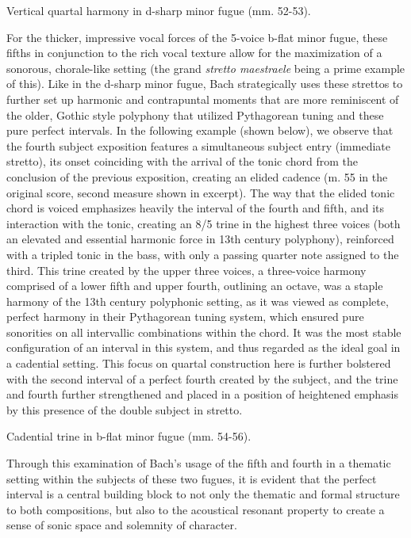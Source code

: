 \begin{Example}[H]
\vspace{1.5em}
    \centering
    \caption{ Vertical quartal harmony in d-sharp minor fugue (mm. 52-53). }
\end{Example}    
    For the thicker, impressive vocal forces of the 5-voice b-flat minor
fugue, these fifths in conjunction to the rich vocal texture allow for
the maximization of a sonorous, chorale-like setting (the grand
\emph{stretto maestraele} being a prime example of this). Like in the
d-sharp minor fugue, Bach strategically uses these strettos to further
set up harmonic and contrapuntal moments that are more reminiscent of
the older, Gothic style polyphony that utilized Pythagorean tuning and
these pure perfect intervals. In the following example (shown below), we
observe that the fourth subject exposition features a simultaneous
subject entry (immediate stretto), its onset coinciding with the arrival
of the tonic chord from the conclusion of the previous exposition,
creating an elided cadence (m. 55 in the original score, second measure
shown in excerpt). The way that the elided tonic chord is voiced
emphasizes heavily the interval of the fourth and fifth, and its
interaction with the tonic, creating an 8/5 trine in the highest three
voices (both an elevated and essential harmonic force in 13th century
polyphony), reinforced with a tripled tonic in the bass, with only a
passing quarter note assigned to the third. This trine created by the
upper three voices, a three-voice harmony comprised of a lower fifth and
upper fourth, outlining an octave, was a staple harmony of the 13th
century polyphonic setting, as it was viewed as complete, perfect
harmony in their Pythagorean tuning system, which ensured pure
sonorities on all intervallic combinations within the chord. It was the
most stable configuration of an interval in this system, and thus
regarded as the ideal goal in a cadential setting. This focus on quartal
construction here is further bolstered with the second interval of a
perfect fourth created by the subject, and the trine and fourth further
strengthened and placed in a position of heightened emphasis by this
presence of the double subject in stretto.



\begin{Example}[H]
\vspace{1.5em}
    \centering
    \caption{ Cadential trine in b-flat minor fugue (mm. 54-56). }
\end{Example}    
    Through this examination of Bach's usage of the fifth and fourth in a
thematic setting within the subjects of these two fugues, it is evident
that the perfect interval is a central building block to not only the
thematic and formal structure to both compositions, but also to the
acoustical resonant property to create a sense of sonic space and
solemnity of character.

